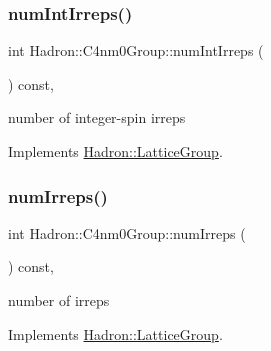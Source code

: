 \mbox{\label{structHadron_1_1C4nm0Group_aefbae18f6b66563a061d607e680fcab7}} 
\subsubsection{\texorpdfstring{numIntIrreps()}{numIntIrreps()}\hspace{0.1cm}{\footnotesize\ttfamily [2/2]}}
{\footnotesize\ttfamily int Hadron\+::\+C4nm0\+Group\+::num\+Int\+Irreps (\begin{DoxyParamCaption}{ }\end{DoxyParamCaption}) const\hspace{0.3cm}{\ttfamily [inline]}, {\ttfamily [virtual]}}

number of integer-\/spin irreps 

Implements \mbox{\hyperlink{structHadron_1_1LatticeGroup_af2aa7b39222bf188389356eefcef7547}{Hadron\+::\+Lattice\+Group}}.

\mbox{\label{structHadron_1_1C4nm0Group_ac77e1943ad8fa5f9211d31dc34ee3f6c}} 
\subsubsection{\texorpdfstring{numIrreps()}{numIrreps()}\hspace{0.1cm}{\footnotesize\ttfamily [1/2]}}
{\footnotesize\ttfamily int Hadron\+::\+C4nm0\+Group\+::num\+Irreps (\begin{DoxyParamCaption}{ }\end{DoxyParamCaption}) const\hspace{0.3cm}{\ttfamily [inline]}, {\ttfamily [virtual]}}

number of irreps 

Implements \mbox{\hyperlink{structHadron_1_1LatticeGroup_a3edaca488144b5d2a9cf73fe653add34}{Hadron\+::\+Lattice\+Group}}.

\mbox{\label{structHadron_1_1C4nm0Group_ac77e1943ad8fa5f9211d31dc34ee3f6c}} 
